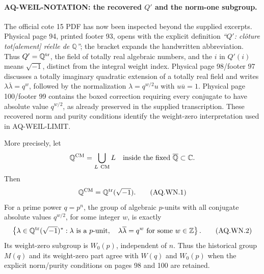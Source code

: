 \paragraph{AQ-WEIL-NOTATION: the recovered $Q'$ and the norm-one subgroup.}
The official cote 15 PDF has now been inspected beyond the
supplied excerpts.  Physical page 94, printed footer 93,
opens with the explicit definition
\emph{``$Q'$: cl\^oture tot[alement] r\'eelle de $\mathbb Q$''};
the bracket expands the handwritten abbreviation.
Thus $Q'=\mathbb Q^{\rm tr}$, the field of totally real
algebraic numbers, and the $i$ in $Q'(i)$ means
$\sqrt{-1}$, distinct from the integral weight index.
Physical page 98/footer 97 discusses a totally imaginary
quadratic extension of a totally real field and writes
$\lambda\overline\lambda=q^w$, followed by the
normalization $\lambda=q^{w/2}u$ with
$u\overline u=1$.
Physical page 100/footer 99 contains the boxed correction
requiring every conjugate to have absolute value $q^{w/2}$,
as already preserved in the supplied transcription.
These recovered norm and purity conditions identify the
weight-zero interpretation used in AQ-WEIL-LIMIT.

More precisely, let
\[
 \mathbb Q^{\rm CM}=\bigcup_{L\ {\mathrm{CM}}}L
 \quad\hbox{inside the fixed }\overline{\mathbb Q}\subset\mathbb C.
\]
Then
\[
 \mathbb Q^{\rm CM}=\mathbb Q^{\rm tr}(\sqrt{-1}).
 \tag{AQ.WN.1}
\]
For a prime power $q=p^n$, the group of algebraic
$p$-units with all conjugate absolute values $q^{w/2}$,
for some integer $w$, is exactly
\[
 \left\{\lambda\in\mathbb Q^{\rm tr}(\sqrt{-1})^*:
   \lambda\text{ is a $p$-unit},\quad
   \lambda\overline\lambda=q^w\text{ for some }w\in\mathbb Z
 \right\}.                                                   \tag{AQ.WN.2}
\]
Its weight-zero subgroup is $W_0(p)$, independent of $n$.
Thus the historical group $M(q)$ and its weight-zero part
agree with $W(q)$ and $W_0(p)$ when the explicit
norm/purity conditions on pages 98 and 100 are retained.

